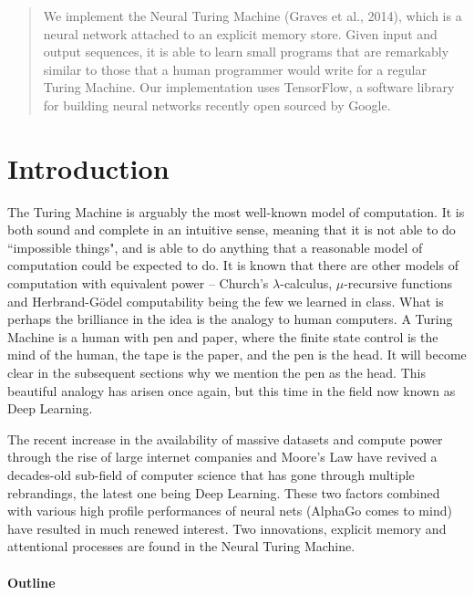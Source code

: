 \documentclass[12pt]{article}
\begin{document}
\maketitle

\begin{abstract}
We implement the Neural Turing Machine (Graves et al., 2014)\cite{DBLP:journals/corr/GravesWD14},
which is a neural network attached to an explicit memory store.
Given input and output sequences, it is able to learn small programs
that are remarkably similar to those that a human programmer would
write for a regular Turing Machine. Our implementation uses
TensorFlow, a software library for building neural networks
recently open sourced by Google.

\end{abstract}

\section{Introduction}

The Turing Machine is arguably the most well-known model of computation.
It is both sound and complete in an intuitive sense, meaning that it
is not able to do ``impossible things", and is able to do anything
that a reasonable model of computation could be expected to do.
It is known that there are other models of computation with equivalent
power -- Church's $\lambda$-calculus, $\mu$-recursive functions and
Herbrand-G\"odel computability being the few we learned in class. What
is perhaps the brilliance in the idea is the analogy to human computers.
A Turing Machine is a human with pen and paper, where the finite state
control is the mind of the human, the tape is the paper, and the pen is
the head. It will become clear in the subsequent sections why we
mention the pen as the head. This beautiful analogy has arisen once
again, but this time in the field now known as Deep Learning.

The recent increase in the availability of massive datasets and compute
power through the rise of large internet companies and Moore's Law have
revived a decades-old sub-field of computer science that has gone through
multiple rebrandings, the latest one being Deep Learning. These two
factors combined with various high profile performances of neural nets
(AlphaGo comes to mind) have resulted in much renewed interest. Two
innovations, explicit memory and attentional processes are found in
the Neural Turing Machine.

\paragraph{Outline}
\end{document}
